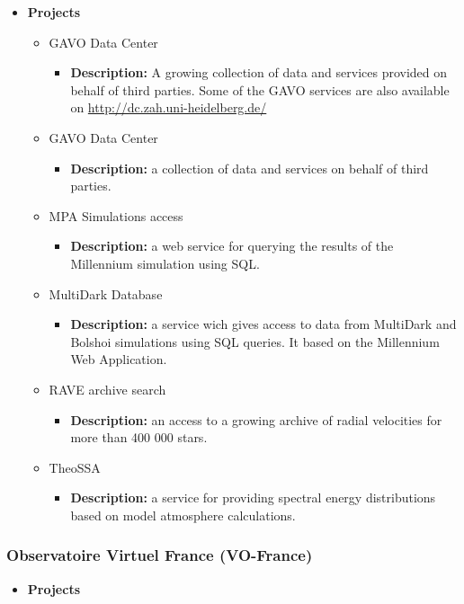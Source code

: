 \begin{itemize}
	\item \textbf{Projects}
	\begin{itemize}
		\item GAVO Data Center
			\begin{itemize}
				\item \textbf{Description:} A growing collection of data and
services provided on behalf of third parties. Some of the GAVO services are
also available on \url{http://dc.zah.uni-heidelberg.de/}
			\end{itemize}
		\item GAVO Data Center
			\begin{itemize}
				\item \textbf{Description:} a collection of data and services
on behalf of third parties.
			\end{itemize}
		\item MPA Simulations access
			\begin{itemize}
				\item \textbf{Description:} a web service for querying the
results of the Millennium simulation using SQL.
			\end{itemize}
		\item MultiDark Database
			\begin{itemize}
				\item \textbf{Description:} a service wich gives access to data
from MultiDark and Bolshoi simulations using SQL queries.  It based on the
Millennium Web Application.
			\end{itemize}
		\item RAVE archive search
			\begin{itemize}
				\item \textbf{Description:} an access to a growing archive of
radial velocities for more than 400 000 stars.
			\end{itemize}
		\item TheoSSA
			\begin{itemize}
				\item \textbf{Description:} a service for providing spectral
energy distributions based on model atmosphere calculations.
			\end{itemize}
	\end{itemize}
\end{itemize}

\subsubsection{Observatoire Virtuel France (VO-France)}
\begin{itemize}
	\item \textbf{Projects}
\end{itemize}

